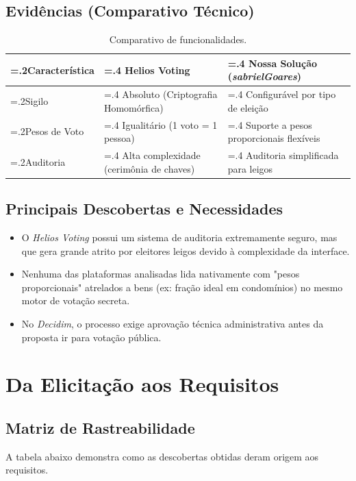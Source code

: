 \documentclass[12pt,a4paper]{article}
\begin{document}
\subsection{Evidências (Comparativo Técnico)}
\begin{table}[H]
\centering
\begin{tabularx}{\textwidth}{>{\hsize=.2\hsize}X >{\hsize=.4\hsize}X >{\hsize=.4\hsize}X}
\toprule
\textbf{Característica} & \textbf{Helios Voting} & \textbf{Nossa Solução (\textit{sabrielGoares})} \\
\midrule
Sigilo & Absoluto (Criptografia Homomórfica) & Configurável por tipo de eleição \\
Pesos de Voto & Igualitário (1 voto = 1 pessoa) & Suporte a pesos proporcionais flexíveis \\
Auditoria & Alta complexidade (cerimônia de chaves) & Auditoria simplificada para leigos \\
\bottomrule
\end{tabularx}
\caption{Comparativo de funcionalidades.}
\end{table}

\subsection{Principais Descobertas e Necessidades}
\begin{itemize}
    \item O \textit{Helios Voting} possui um sistema de auditoria extremamente seguro, mas que gera grande atrito por eleitores leigos devido à complexidade da interface.
    \item Nenhuma das plataformas analisadas lida nativamente com "pesos proporcionais" atrelados a bens (ex: fração ideal em condomínios) no mesmo motor de votação secreta.
    \item No \textit{Decidim}, o processo exige aprovação técnica administrativa antes da proposta ir para votação pública.
\end{itemize}

\section{Da Elicitação aos Requisitos}

\subsection{Matriz de Rastreabilidade}
A tabela abaixo demonstra como as descobertas obtidas deram origem aos requisitos.
\end{document}
